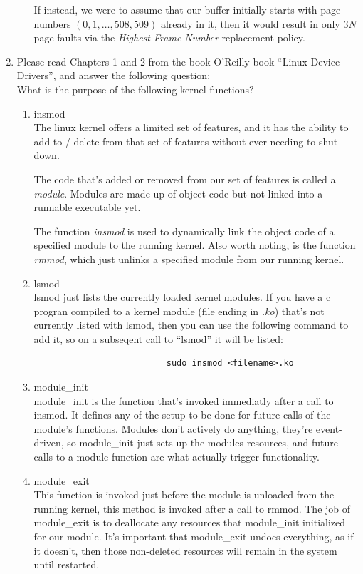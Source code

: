 \documentclass[11pt]{article}
\newcommand{\n}{\vspace{0.3cm}}
\begin{document}
\begin{enumerate}
\begin{enumerate}
        If instead, we were to assume that our buffer initially starts with page numbers \((0,1,\hdots,508,509)\) already in it, then it would result in only \(3N\) page-faults via the \textit{Highest Frame Number} replacement policy.
    \end{enumerate} \n

  \item Please read Chapters 1 and 2 from the book O’Reilly book ``Linux Device Drivers'', and answer the following question: \\
    What is the purpose of the following kernel functions?
    \begin{enumerate}
      \item insmod \n\\
        The linux kernel offers a limited set of features, and it has the ability to add-to / delete-from that set of features without ever needing to shut down.

        The code that's added or removed from our set of features is called a \textit{module}.  Modules are made up of object code but not linked into a runnable executable yet.

        The function \textit{insmod} is used to dynamically link the object code of a specified module to the running kernel.  Also worth noting, is the function \textit{rmmod}, which just unlinks a specified module from our running kernel. \n

      \item lsmod \n\\
        lsmod just lists the currently loaded kernel modules.  If you have a c progran compiled to a kernel module (file ending in \textit{.ko}) that's not currently listed with lsmod, then you can use the following command to add it, so on a subseqent call to ``lsmod'' it will be listed:\begin{verbatim}
                          sudo insmod <filename>.ko
        \end{verbatim} 
      \item module\_init \n\\
        module\_init is the function that's invoked immediatly after a call to insmod.  It defines any of the setup to be done for future calls of the module's functions.  Modules don't actively do anything, they're event-driven, so module\_init just sets up the modules resources, and future calls to a module function are what actually trigger functionality. \n

      \item module\_exit \n\\
        This function is invoked just before the module is unloaded from the running kernel, this method is invoked after a call to rmmod.  The job of module\_exit is to deallocate any resources that module\_init initialized for our module.  It's important that module\_exit undoes everything, as if it doesn't, then those non-deleted resources will remain in the system until restarted.
    \end{enumerate}
\end{enumerate}
\end{document}
